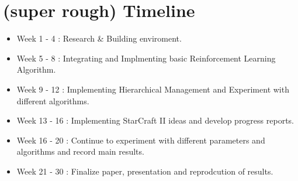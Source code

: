 \documentclass[12pt]{article}
\begin{document}
\section{(super rough) Timeline}

\begin{itemize}
    \item Week 1 - 4 : Research \& Building enviroment.
    \item Week 5 - 8 : Integrating and Implmenting basic Reinforcement Learning Algorithm.
    \item Week 9 - 12 : Implementing Hierarchical Management and Experiment with different algorithms.
    \item Week 13 - 16 : Implementing StarCraft II ideas and develop progress reports.
    \item Week 16 - 20 : Continue to experiment with different parameters and algorithms and record main results.
    \item Week 21 - 30 : Finalize paper, presentation and reprodcution of results.
\end{itemize}
\end{document}
